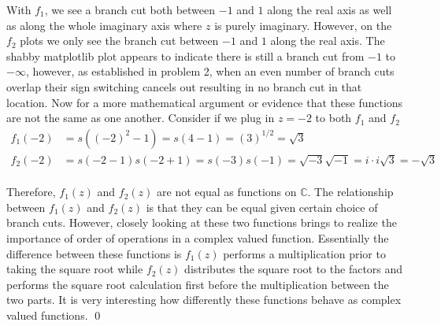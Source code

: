\documentclass[10pt]{amsart}
\theoremstyle{nonumberplain}
\begin{document}
\begin{enumerate}[label={\bf {\arabic*}:}]
With $f_1$, we see a branch cut both between $-1$ and $1$ along the real axis as well as along the whole imaginary axis where $z$ is purely imaginary.
However, on the $f_2$ plots we only see the branch cut between $-1$ and $1$ along the real axis.
The shabby matplotlib plot appears to indicate there is still a branch cut from $-1$ to $-\infty$, however, as established in problem 2, when an even number of branch cuts overlap their sign switching cancels out resulting in no branch cut in that location.
Now for a more mathematical argument or evidence that these functions are not the same as one another.
Consider if we plug in $z = -2$ to both $f_1$ and $f_2$ \\
\begin{align*}
f_1(-2) &= s((-2)^2 - 1) = s(4 - 1) = (3)^{1/2} = \sqrt{3} \\
f_2(-2) &= s(-2 - 1)s(-2 + 1) = s(-3)s(-1) = \sqrt{-3}\sqrt{-1} = i\cdot i \sqrt{3} = -\sqrt{3}
\end{align*} \\
Therefore, $f_1(z)$ and $f_2(z)$ are not equal as functions on $\mathbb{C}$.
The relationship between $f_1(z)$ and $f_2(z)$ is that they can be equal given certain choice of branch cuts.
However, closely looking at these two functions brings to realize the importance of order of operations in a complex valued function.
Essentially the difference between these functions is $f_1(z)$ performs a multiplication prior to taking the square root while $f_2(z)$ distributes the square root to the factors and performs the square root calculation first before the multiplication between the two parts. It is very interesting how differently these functions behave as complex valued functions.
\qed
\\


\end{enumerate}
\end{document}
